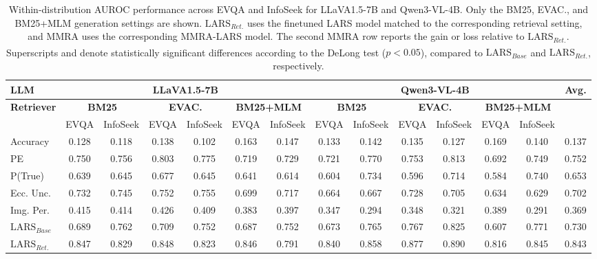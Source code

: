 \renewcommand{\arraystretch}{1.1}
\begin{table}[t]
\centering
\setlength{\tabcolsep}{3.2pt}
\caption{Within-distribution AUROC performance across EVQA and InfoSeek for LLaVA1.5-7B and Qwen3-VL-4B. Only the BM25, EVAC., and BM25+MLM generation settings are shown. $\text{LARS}_{Ret.}$ uses the finetuned LARS model matched to the corresponding retrieval setting, and \textbf{$\text{MMRA}$} uses the corresponding MMRA-LARS model. The second MMRA row reports the gain or loss relative to $\text{LARS}_{Ret.}$. Superscripts \textsuperscript{\dag} and \textsuperscript{\ddag} denote statistically significant differences according to the DeLong test ($p<0.05$), compared to $\text{LARS}_{Base}$ and $\text{LARS}_{Ret.}$, respectively.}
\label{tab:within_distribution}
\shrink
\begin{tabular}{l|cc|cc|cc|cc|cc|cc|c}
\hline
\textbf{LLM} & \multicolumn{6}{c|}{\textbf{LLaVA1.5-7B}} & \multicolumn{6}{c|}{\textbf{Qwen3-VL-4B}} & \textbf{Avg.} \\ \hline
\textbf{Retriever} & \multicolumn{2}{c}{\textbf{BM25}} & \multicolumn{2}{c}{\textbf{EVAC.}} & \multicolumn{2}{c|}{\textbf{BM25+MLM}} & \multicolumn{2}{c}{\textbf{BM25}} & \multicolumn{2}{c}{\textbf{EVAC.}} & \multicolumn{2}{c|}{\textbf{BM25+MLM}} & \\ \hline
\textbf{} & EVQA & InfoSeek & EVQA & InfoSeek & EVQA & InfoSeek & EVQA & InfoSeek & EVQA & InfoSeek & EVQA & InfoSeek & \\ \hline
Accuracy & 0.128 & 0.118 & 0.138 & 0.102 & 0.163 & 0.147 & 0.133 & 0.142 & 0.135 & 0.127 & 0.169 & 0.140 & 0.137 \\
PE & 0.750 & 0.756 & 0.803 & 0.775 & 0.719 & 0.729 & 0.721 & 0.770 & 0.753 & 0.813 & 0.692 & 0.749 & 0.752 \\
P(True) & 0.639 & 0.645 & 0.677 & 0.645 & 0.641 & 0.614 & 0.604 & 0.734 & 0.596 & 0.714 & 0.584 & 0.740 & 0.653 \\
Ecc. Unc. & 0.732 & 0.745 & 0.752 & 0.755 & 0.699 & 0.717 & 0.664 & 0.667 & 0.728 & 0.705 & 0.634 & 0.629 & 0.702 \\
Img. Per. & 0.415 & 0.414 & 0.426 & 0.409 & 0.383 & 0.397 & 0.347 & 0.294 & 0.348 & 0.321 & 0.389 & 0.291 & 0.369 \\
$\text{LARS}_{Base}$ & 0.689 & 0.762 & 0.709 & 0.752 & 0.687 & 0.752 & 0.673 & 0.765 & 0.767 & 0.825 & 0.607 & 0.771 & 0.730 \\
$\text{LARS}_{Ret.}$ & 0.847 & 0.829 & 0.848 & 0.823 & 0.846 & 0.791 & 0.840 & 0.858 & 0.877 & 0.890 & 0.816 & 0.845 & 0.843 \\

\end{tabular}
\end{table}
